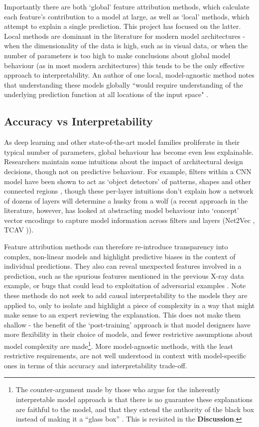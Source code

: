 \documentclass[main]{subfiles}
\begin{document}
Importantly there are both `global' feature attribution methods, which calculate each feature's contribution to a model at large, as well as `local' methods, which attempt to explain a single prediction. This project has focused on the latter. Local methods are dominant in the literature for modern model architectures - when the dimensionality of the data is high, such as in visual data, or when the number of parameters is too high to make conclusions about global model behaviour (as in most modern architectures) this tends to be the only effective approach to interpretability. An author of one local, model-agnostic method notes that understanding these models globally ``would require understanding of the underlying prediction function at all locations of the input space" \cite{local}. 

\subsection*{Accuracy vs Interpretability}

As deep learning and other state-of-the-art model families proliferate in their typical number of parameters, global behaviour has become even less explainable. Researchers maintain some intuitions about the impact of architectural design decisions, though not on predictive behaviour. For example, filters within a CNN model have been shown to act as `object detectors' of patterns, shapes and other connected regions \cite{objectdetect}, though these per-layer intuitions don't explain how a network of dozens of layers will determine a husky from a wolf (a recent approach in the literature, however, has looked at abstracting model behaviour into `concept' vector encodings to capture model information across  filters and layers (Net2Vec \cite{net2vec}, TCAV \cite{tcav})).

Feature attribution methods can therefore re-introduce transparency into complex, non-linear models and highlight predictive biases in the context of individual predictions. They also can reveal unexpected features involved in a prediction, such as the spurious features mentioned in the previous X-ray data example, or bugs that could lead to exploitation of adversarial examples \cite{adversary}. Note these methods do not seek to add causal interpretability to the models they are applied to, only to isolate and highlight a piece of complexity in a way that might make sense to an expert reviewing the explanation. This does not make them shallow - the benefit of the `post-training' approach is that model designers have more flexibility in their choice of models, and fewer restrictive assumptions about model complexity are made\footnote{The counter-argument made by those who argue for the inherently interpretable model approach is that there is no guarantee these explanations are faithful to the model, and that they extend the authority of the black box instead of making it a ``glass box'' \cite{rudin}. This is revisited in the \textbf{Discussion}.}. More model-agnostic methods, with the least restrictive requirements, are not well understood in context with model-specific ones in terms of this accuracy and interpretability trade-off.
\end{document}
